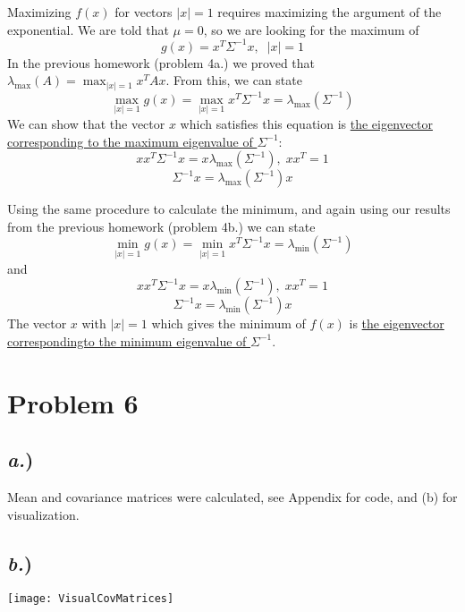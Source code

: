 \documentclass{report}
\begin{document}
Maximizing $f(x)$ for vectors $|x| = 1$ requires maximizing the argument of the exponential. We are told that $\mu = 0$, so we are looking for the maximum of 
$$ g(x) = x^T\Sigma^{-1}x, \;\; |x|= 1 $$
In the previous homework (problem 4a.) we proved that $\lambda_{\text{max}}(A) = \max_{|x|=1}{x^TAx}$. From this, we can state
$$ \max_{|x|=1}{g(x)} = \max_{|x|=1}{x^T\Sigma^{-1}x} = \lambda_{\text{max}}(\Sigma^{-1}) $$
We can show that the vector $x$ which satisfies this equation is \uline{the eigenvector corresponding to the maximum eigenvalue of $\Sigma^{-1}$}:
$$ xx^T\Sigma^{-1}x = x\lambda_{\text{max}}(\Sigma^{-1}), \; xx^T = 1$$
$$ \Sigma^{-1}x = \lambda_{\text{max}}(\Sigma^{-1})x $$

Using the same procedure to calculate the minimum, and again using our results from the previous homework (problem 4b.) we can state
$$ \min_{|x|=1}{g(x)} = \min_{|x|=1}{x^T\Sigma^{-1}x} = \lambda_{\text{min}}(\Sigma^{-1}) $$
and 
$$ xx^T\Sigma^{-1}x = x\lambda_{\text{min}}(\Sigma^{-1}), \; xx^T = 1$$
$$ \Sigma^{-1}x = \lambda_{\text{min}}(\Sigma^{-1})x $$
The vector $x$ with $|x|=1$ which gives the minimum of $f(x)$ is \uline{the eigenvector correspondingto the minimum eigenvalue of $\Sigma^{-1}$}.





\newpage
\section*{Problem 6}

\subsection*{\textit{a.})}

Mean and covariance matrices were calculated, see Appendix for code, and (b) for visualization.


\subsection*{\textit{b.})}
\texttt{[image: VisualCovMatrices]}
\end{document}
